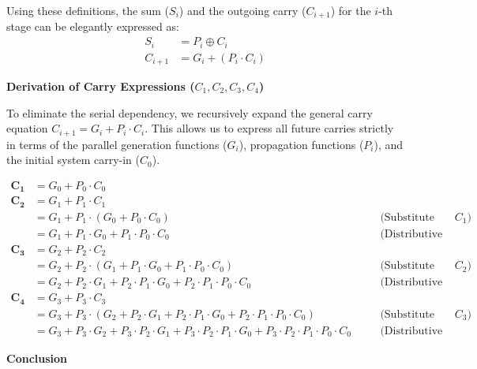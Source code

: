\documentclass[12pt,a3paper]{article}
\begin{document}
\begin{enumerate}
\begin{tcolorbox}[enhanced,breakable,ansbox,colback=cD!4,colframe=cD,boxrule=0.8pt,arc=5pt,title={\textbf{Answer}},fonttitle=\bfseries\color{white},colbacktitle=cD]
Using these definitions, the sum ($S_i$) and the outgoing carry ($C_{i+1}$) for the $i$-th stage can be elegantly expressed as:
\begin{align*}
    S_i &= P_i \oplus C_i \\
    C_{i+1} &= G_i + (P_i \cdot C_i)
\end{align*}

\vspace{1em}
\textbf{Derivation of Carry Expressions ($C_1, C_2, C_3, C_4$)}
\vspace{0.5em}

To eliminate the serial dependency, we recursively expand the general carry equation $C_{i+1} = G_i + P_i \cdot C_i$. This allows us to express all future carries strictly in terms of the parallel generation functions ($G_i$), propagation functions ($P_i$), and the initial system carry-in ($C_0$).

\begin{align*}
    \mathbf{C_1} &= G_0 + P_0 \cdot C_0 \\[1.5em]
    \mathbf{C_2} &= G_1 + P_1 \cdot C_1 \\
        &= G_1 + P_1 \cdot (G_0 + P_0 \cdot C_0) \quad &&\text{(Substitute expression for } C_1 \text{)} \\
        &= G_1 + P_1 \cdot G_0 + P_1 \cdot P_0 \cdot C_0 \quad &&\text{(Distributive Law)} \\[1.5em]
    \mathbf{C_3} &= G_2 + P_2 \cdot C_2 \\
        &= G_2 + P_2 \cdot (G_1 + P_1 \cdot G_0 + P_1 \cdot P_0 \cdot C_0) \quad &&\text{(Substitute expression for } C_2 \text{)} \\
        &= G_2 + P_2 \cdot G_1 + P_2 \cdot P_1 \cdot G_0 + P_2 \cdot P_1 \cdot P_0 \cdot C_0 \quad &&\text{(Distributive Law)} \\[1.5em]
    \mathbf{C_4} &= G_3 + P_3 \cdot C_3 \\
        &= G_3 + P_3 \cdot (G_2 + P_2 \cdot G_1 + P_2 \cdot P_1 \cdot G_0 + P_2 \cdot P_1 \cdot P_0 \cdot C_0) \quad &&\text{(Substitute expression for } C_3 \text{)} \\
        &= G_3 + P_3 \cdot G_2 + P_3 \cdot P_2 \cdot G_1 + P_3 \cdot P_2 \cdot P_1 \cdot G_0 + P_3 \cdot P_2 \cdot P_1 \cdot P_0 \cdot C_0 \quad &&\text{(Distributive Law)}
\end{align*}

\vspace{1em}
\textbf{Conclusion}
\vspace{0.5em}


\end{tcolorbox}
\end{enumerate}
\end{document}
